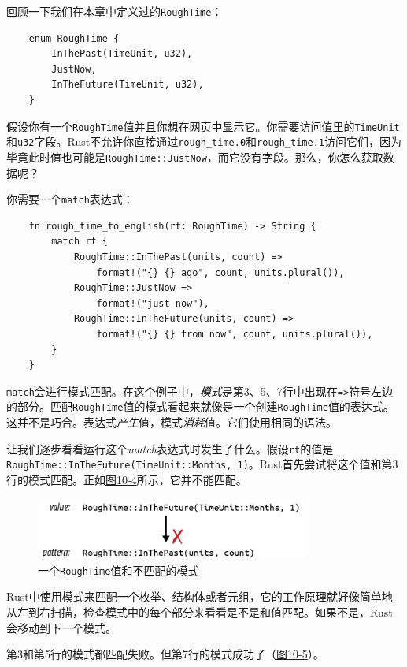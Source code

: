 回顾一下我们在本章中定义过的\texttt{RoughTime}：
\begin{verbatim}
    enum RoughTime {
        InThePast(TimeUnit, u32),
        JustNow,
        InTheFuture(TimeUnit, u32),
    }
\end{verbatim}

假设你有一个\texttt{RoughTime}值并且你想在网页中显示它。你需要访问值里的\texttt{TimeUnit}和\texttt{u32}字段。Rust不允许你直接通过\texttt{rough\_time.0}和\texttt{rough\_time.1}访问它们，因为毕竟此时值也可能是\texttt{RoughTime::JustNow}，而它没有字段。那么，你怎么获取数据呢？

你需要一个\texttt{match}表达式：
\begin{verbatim}
    fn rough_time_to_english(rt: RoughTime) -> String {
        match rt {
            RoughTime::InThePast(units, count) =>
                format!("{} {} ago", count, units.plural()),
            RoughTime::JustNow =>
                format!("just now"),
            RoughTime::InTheFuture(units, count) =>
                format!("{} {} from now", count, units.plural()),
        }
    }
\end{verbatim}
\texttt{match}会进行模式匹配。在这个例子中，\emph{模式}是第3、5、7行中出现在\texttt{=>}符号左边的部分。匹配\texttt{RoughTime}值的模式看起来就像是一个创建\texttt{RoughTime}值的表达式。这并不是巧合。表达式\emph{产生}值，模式\emph{消耗}值。它们使用相同的语法。

让我们逐步看看运行这个\emph{match}表达式时发生了什么。假设\texttt{rt}的值是\\
\texttt{RoughTime::InTheFuture(TimeUnit::Months, 1)}。Rust首先尝试将这个值和第3行的模式匹配。正如\hyperref[f10-4]{图10-4}所示，它并不能匹配。

\begin{figure}[htbp]
    \centering
    \includegraphics[width=0.8\textwidth]{../img/f10-4.png}
    \caption{一个\texttt{RoughTime}值和不匹配的模式}
    \label{f10-4}
\end{figure}

Rust中使用模式来匹配一个枚举、结构体或者元组，它的工作原理就好像简单地从左到右扫描，检查模式中的每个部分来看看是不是和值匹配。如果不是，Rust会移动到下一个模式。

第3和第5行的模式都匹配失败。但第7行的模式成功了（\hyperref[f10-5]{图10-5}）。

